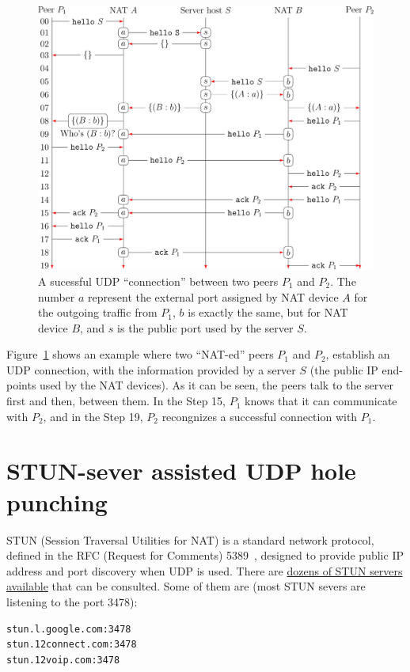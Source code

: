 \begin{figure}
  \includegraphics{graphics/UDP_Hole_Punching_RCN}
  \caption{A sucessful UDP ``connection'' between two peers $P_1$ and
    $P_2$. The number $a$ represent the external port assigned by
    NAT device $A$ for the outgoing traffic from $P_1$, $b$ is exactly
    the same, but for NAT device $B$, and $s$ is the public port used
    by the server $S$.}
  \label{fig:UHP}
\end{figure}

Figure~\ref{fig:UHP} shows an example where two ``NAT-ed'' peers $P_1$
and $P_2$, establish an UDP connection, with the information provided
by a server $S$ (the public IP end-points used by the NAT devices). As
it can be seen, the peers talk to the server first and then, between
them. In the Step 15, $P_1$ knows that it can communicate with $P_2$,
and in the Step 19, $P_2$ recongnizes a successful connection with
$P_1$.

\section{STUN-sever assisted UDP hole punching}

STUN (Session Traversal Utilities for NAT) is a standard network
protocol, defined in the RFC (Request for Comments) 5389~\cite{STUN},
designed to provide public IP address and port discovery when UDP is
used. There are
\href{https://gist.github.com/mondain/b0ec1cf5f60ae726202e}{dozens of
  STUN servers available} that can be consulted. Some of them are
(most STUN severs are listening to the port 3478):
\begin{verbatim}
stun.l.google.com:3478
stun.12connect.com:3478
stun.12voip.com:3478
\end{verbatim}

